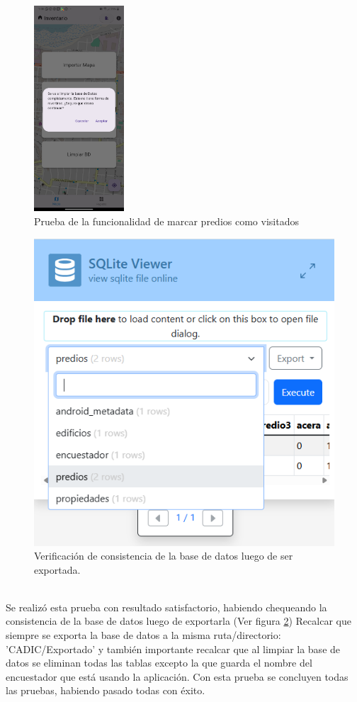 \begin{figure}[h]
    \includegraphics[width=0.3\textwidth]{Graphics/Capitulo 4/LG Android 13/4.7/Screenshot_20250615-130550.png}
    \caption{Prueba de la funcionalidad de marcar predios como visitados}
    \label{fig:figura25}
\end{figure}
\begin{figure}[h]
    \centering
    \includegraphics[]{Graphics/Capitulo 4/verificacion_BD_exportada.png}
    \caption{Verificación de consistencia de la base de datos luego de ser exportada.}
    \label{fig:figura26}
\end{figure}\\
Se realizó esta prueba con resultado satisfactorio, habiendo chequeando la consistencia de la base de datos luego de exportarla (Ver figura \ref{fig:figura26})
Recalcar que siempre se exporta la base de datos a la misma ruta/directorio: 'CADIC/Exportado' y también importante recalcar que al limpiar la base de datos se eliminan todas las tablas
excepto la que guarda el nombre del encuestador que está usando la aplicación.
Con esta prueba se concluyen todas las pruebas, habiendo pasado todas con éxito.


